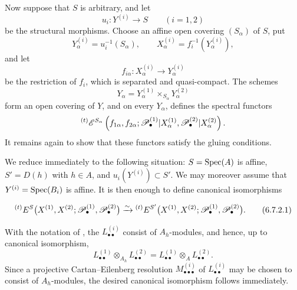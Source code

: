 \begin{env}[6.7.2]
\label{III.6.7.2}
Now suppose that $S$ is arbitrary, and let
\[
  u_i:Y^{(i)}\longrightarrow S
  \qquad(i=1,2)
\]
be the structural morphisms.  Choose an affine open covering
$(S_\alpha)$ of $S$, put
\[
  Y_\alpha^{(i)}=u_i^{-1}(S_\alpha),
  \qquad
  X_\alpha^{(i)}=f_i^{-1}(Y_\alpha^{(i)}),
\]
and let
\[
  f_{i\alpha}:X_\alpha^{(i)}\longrightarrow Y_\alpha^{(i)}
\]
be the restriction of $f_i$, which is separated and
quasi-compact.  The schemes
\[
  Y_\alpha
  =
  Y_\alpha^{(1)}
  \times_{S_\alpha}Y_\alpha^{(2)}
\]
form an open covering of $Y$, and on every $Y_\alpha$,
 defines the spectral functors
\[
  {}^{(t)}\mathscr{E}^{S_\alpha}
  \left(
    f_{1\alpha},f_{2\alpha};
    \mathscr{P}_\bullet^{(1)}|X_\alpha^{(1)},
    \mathscr{P}_\bullet^{(2)}|X_\alpha^{(2)}
  \right).
\]
It remains again to show that these functors satisfy the gluing
conditions.

We reduce immediately to the following situation:
$S=\operatorname{Spec}(A)$ is affine,
$S'=D(h)$ with $h\in A$, and
$u_i(Y^{(i)})\subset S'$.  We may moreover assume that
$Y^{(i)}=\operatorname{Spec}(B_i)$ is affine.  It is then enough to define
canonical isomorphisms
\begin{env}[6.7.2.1]
\label{III.6.7.2.1}
\[
  {}^{(t)}E^S
  \bigl(
    X^{(1)},X^{(2)};
    \mathscr{P}_\bullet^{(1)},\mathscr{P}_\bullet^{(2)}
  \bigr)
  \xrightarrow{\sim}
  {}^{(t)}E^{S'}
  \bigl(
    X^{(1)},X^{(2)};
    \mathscr{P}_\bullet^{(1)},\mathscr{P}_\bullet^{(2)}
  \bigr).
  \tag{6.7.2.1}\label{III.6.7.2.1.eq}
\]
\end{env}
With the notation of , the
$L_{\bullet\bullet}^{(i)}$ consist of $A_h$-modules, and hence,
up to canonical isomorphism,
\[
  L_{\bullet\bullet}^{(1)}
  \otimes_{A_h}L_{\bullet\bullet}^{(2)}
  =
  L_{\bullet\bullet}^{(1)}
  \otimes_A L_{\bullet\bullet}^{(2)}.
\]
Since a projective Cartan--Eilenberg resolution
$M_{\bullet\bullet\bullet}^{(i)}$ of $L_{\bullet\bullet}^{(i)}$ may be
chosen to consist of $A_h$-modules, the desired canonical
isomorphism follows immediately.
\end{env}

